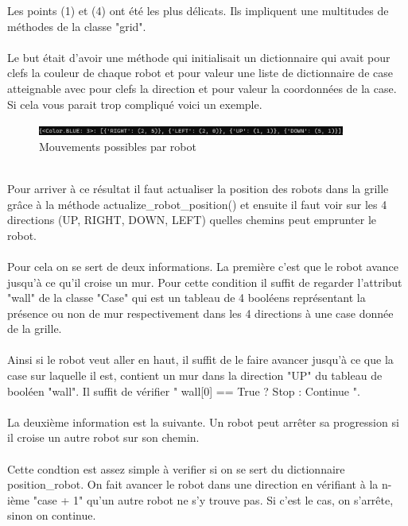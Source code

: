 \documentclass{article}
\begin{document}
Les points (1) et (4) ont été les plus délicats. Ils impliquent une multitudes de méthodes de la classe "grid".\\\\ Le but était d'avoir une méthode qui initialisait un dictionnaire qui avait pour clefs la couleur de chaque robot et pour valeur une liste de dictionnaire de case atteignable avec pour clefs la direction et pour valeur la coordonnées de la case. Si cela vous parait trop compliqué voici un exemple.
\begin{figure}[htbp]
  \centering  
  \includegraphics[width=0.9\textwidth]{possible_move.png}  
  \caption{Mouvements possibles par robot} 
  \label{fig:Mission}  
\end{figure}\\
Pour arriver à ce résultat il faut actualiser la position des robots dans la grille grâce à la méthode actualize\_robot\_position() et ensuite il faut voir sur les 4 directions (UP, RIGHT, DOWN, LEFT) quelles chemins peut emprunter le robot.\\\\ 
Pour cela on se sert de deux informations. La première c'est que le robot avance jusqu'à ce qu'il croise un mur. Pour cette condition il suffit de regarder l'attribut "wall" de la classe "Case" qui est un tableau de 4 booléens représentant la présence ou non de mur respectivement dans les 4 directions à une case donnée de la grille.\\\\
Ainsi si le robot veut aller en haut, il suffit de le faire avancer jusqu'à ce que la case sur laquelle il est, contient un mur dans la direction "UP" du tableau de booléen "wall". Il suffit de vérifier  " wall[0] == True ? Stop : Continue ".\\\\
La deuxième information est la suivante. Un robot peut arrêter sa progression si il croise un autre robot sur son chemin.\\\\ Cette condtion est assez simple à verifier si on se sert du dictionnaire position\_robot. On fait avancer le robot dans une direction en vérifiant à la n-ième "case + 1" qu'un autre robot ne s'y trouve pas. Si c'est le cas, on s'arrête, sinon on continue. 
\end{document}
